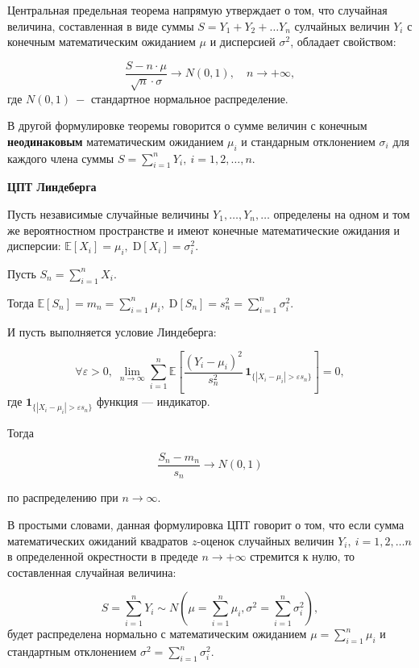 \documentclass[
]{article}
\begin{document}
Центральная предельная теорема напрямую утверждает о том, что случайная
величина, составленная в виде суммы \(S = Y_1 + Y_2 + \dots Y_n\)
сулчайных величин \(Y_i\) с конечным математическим ожиданием \(\mu\) и
дисперсией \(\sigma^2\), обладает свойством:

\[
  \frac{S - n\cdot \mu}{\sqrt{n} \cdot \sigma} \to N(0, 1), \quad n\rightarrow +\infty,
\] где \(N(0, 1)\ -\) стандартное нормальное распределение.

В другой формулировке теоремы говорится о сумме величин с конечным
\textbf{неодинаковым} математическим ожиданием \(\mu_i\) и стандарным
отклонением \(\sigma_i\) для каждого члена суммы
\(S = \sum_{i=1}^nY_i, \ i=1,2,\dots, n\).

\textbf{ЦПТ Линдеберга}

Пусть независимые случайные величины \(Y_{1},\ldots ,Y_{n},\ldots\)
определены на одном и том же вероятностном пространстве и имеют конечные
математические ожидания и дисперсии:
\({\mathbb {E}}[X_{i}]=\mu _{i},\;{\mathrm {D}}[X_{i}]=\sigma _{i}^{2}\).

Пусть \(S_{n}=\sum \limits _{i=1}^{n}X_{i}\).

Тогда
\({\mathbb {E}}[S_{n}]=m_{n}=\sum \limits_{{i=1}}^{n}\mu_{i},\;{\mathrm {D}}[S_{n}]=s_{n}^{2}=\sum \limits_{{i=1}}^{n}\sigma _{i}^{2}\).

И пусть выполняется условие Линдеберга:

\[
\forall \varepsilon >0,\;\lim \limits _{{n\to \infty }}\sum \limits _{{i=1}}^{n}{\mathbb {E}}\left[{\frac {(Y_{i}-\mu _{i})^{2}}{s_{n}^{2}}}\,{\mathbf {1}}_{{\{|X_{i}-\mu _{i}|>\varepsilon s_{n}\}}}\right]=0,
\] где \({\mathbf {1}}_{{\{|X_{i}-\mu _{i}|>\varepsilon s_{n}\}}}\)
функция --- индикатор.

Тогда

\[
{\frac {S_{n}-m_{n}}{s_{n}}}\to N(0,1)
\]

по распределению при \(n\to \infty\).

В простыми словами, данная формулировка ЦПТ говорит о том, что если
сумма математических ожиданий квадратов \(z\)-оценок случайных величин
\(Y_i, \ i=1,2,\dots n\) в определенной окрестности в предеде
\(n \to +\infty\) стремится к нулю, то составленная случайная величина:

\[
S = \sum_{i=1}^{n} Y_i \sim N\left(\mu =\sum_{i=1}^n \mu_i, \sigma^2 = \sum_{i=1}^{n} \sigma_i^2\right),
\] будет распределена нормально с математическим ожиданием
\(\mu = \sum_{i=1}^n \mu_i\) и стандартным отклонением
\(\sigma^2 = \sum_{i=1}^{n} \sigma_i^2\).
\end{document}
